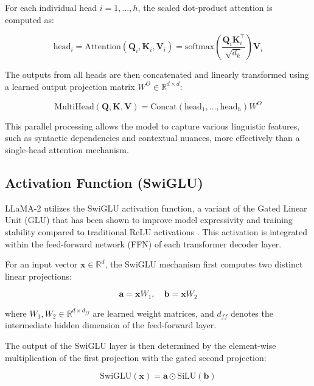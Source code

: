 For each individual head $i = 1, \dots, h$, the scaled dot-product attention is computed as:

\begin{equation}
\text{head}_i = \text{Attention}(\mathbf{Q}_i, \mathbf{K}_i, \mathbf{V}_i) = \text{softmax}\left(\frac{\mathbf{Q}_i \mathbf{K}_i^\top}{\sqrt{d_k}}\right) \mathbf{V}_i
\end{equation}

The outputs from all heads are then concatenated and linearly transformed using a learned output projection matrix $W^O \in \mathbb{R}^{d \times d}$:

\begin{equation}
\text{MultiHead}(\mathbf{Q}, \mathbf{K}, \mathbf{V}) = \text{Concat}(\text{head}_1, \dots, \text{head}_h) W^O
\end{equation}

This parallel processing allows the model to capture various linguistic features, such as syntactic dependencies and contextual nuances, more effectively than a single-head attention mechanism.

\subsection{Activation Function (SwiGLU)}
LLaMA-2 utilizes the SwiGLU activation function, a variant of the Gated Linear Unit (GLU) that has been shown to improve model expressivity and training stability compared to traditional ReLU activations \cite{shazeer2020glu}. This activation is integrated within the feed-forward network (FFN) of each transformer decoder layer.

For an input vector $\mathbf{x} \in \mathbb{R}^d$, the SwiGLU mechanism first computes two distinct linear projections:

\begin{equation}
\mathbf{a} = \mathbf{x} W_1, \quad \mathbf{b} = \mathbf{x} W_2
\end{equation}

where $W_1, W_2 \in \mathbb{R}^{d \times d_{ff}}$ are learned weight matrices, and $d_{ff}$ denotes the intermediate hidden dimension of the feed-forward layer. 



The output of the SwiGLU layer is then determined by the element-wise multiplication of the first projection with the gated second projection:

\begin{equation}
\text{SwiGLU}(\mathbf{x}) = \mathbf{a} \odot \text{SiLU}(\mathbf{b})
\end{equation}

